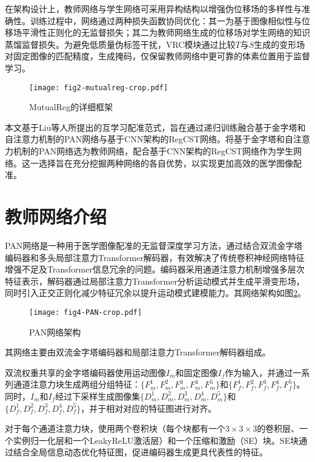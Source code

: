 在架构设计上，教师网络与学生网络可采用异构结构以增强伪位移场的多样性与准确性。训练过程中，网络通过两种损失函数协同优化：其一为基于图像相似性与位移场平滑性正则化的无监督损失；其二为教师网络生成的位移场对学生网络的知识蒸馏监督损失。为避免低质量伪标签干扰，VRC模块通过比较$T$与$S$生成的变形场对固定图像的匹配精度，生成掩码，仅保留教师网络中更可靠的体素位置用于监督学习。

\begin{figure}[h]
    \centering
    \texttt{[image: fig2-mutualreg-crop.pdf]}
    \caption{MutualReg的详细框架}
    \label{fig:2}
\end{figure}



本文基于Liu等人所提出的互学习配准范式\cite{liu2024mutualreg}，旨在通过递归训练融合基于金字塔和自注意力机制的PAN网络\cite{wang2024pyramid}与基于CNN架构的RegCST网络\cite{bigalke2023unsupervised}。将基于金字塔和自注意力机制的PAN网络选为教师网络，配合基于CNN架构的RegCST网络\cite{bigalke2023unsupervised}作为学生网络。这一选择旨在充分挖掘两种网络的各自优势，以实现更加高效的医学图像配准。

\section{教师网络介绍}

PAN网络\cite{wang2024pyramid}是一种用于医学图像配准的无监督深度学习方法，通过结合双流金字塔编码器和多头局部注意力Transformer解码器，有效解决了传统卷积神经网络特征增强不足及Transformer信息冗余的问题。编码器采用通道注意力机制增强多层次特征表示，解码器通过局部注意力Transformer分析运动模式并生成平滑变形场，同时引入正交正则化减少特征冗余以提升运动模式建模能力。其网络架构如图\ref{fig:4}。

\begin{figure}[h]
    \centering
    \texttt{[image: fig4-PAN-crop.pdf]}
    \caption{PAN网络架构}
    \label{fig:4}
\end{figure}

其网络主要由双流金字塔编码器和局部注意力Transformer解码器组成。

双流权重共享的金字塔编码器使用运动图像$I_m$和固定图像$I_f$作为输入，并通过一系列通道注意力块生成两组分组特征：$\{F_m^1,F_m^2,F_m^3,F_m^4,F_m^5\}$和$\{F_f^1,F_f^2,F_f^3,F_f^4,F_f^5\}$。同时，$I_m$和$I_f$经过下采样生成图像集$\{D_m^1,D_m^2,D_m^3,D_m^4,D_m^5\}$和$\{D_f^1,D_f^2,D_f^3,D_f^4,D_f^5\}$，并于相对对应的特征图进行对齐。

对于每个通道注意力块，使用两个卷积块（每个块都有一个$3\times3\times 3$的卷积层、一个实例归一化层\cite{ulyanov2016instance}和一个LeakyReLU激活层）和一个压缩和激励（SE）块\cite{hu2018squeeze}。SE块通过结合全局信息动态优化特征图，促进编码器生成更具代表性的特征。

